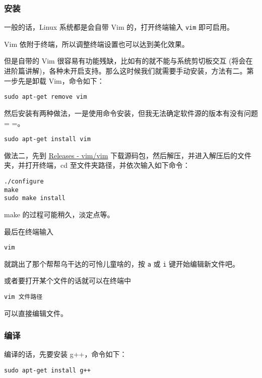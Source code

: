 \subsubsection{安装}

一般的话，Linux 系统都是会自带 Vim 的，打开终端输入 \texttt{vim} 即可启用。

Vim 依附于终端，所以调整终端设置也可以达到美化效果。

但是自带的 Vim 很容易有功能残缺，比如有的就不能与系统剪切板交互 (将会在进阶篇讲解)，各种未开启支持。那么这时候我们就需要手动安装，方法有二。第一步先是卸载 Vim，命令如下：

\begin{verbatim}
sudo apt-get remove vim
\end{verbatim}

然后安装有两种做法，一是使用命令安装，但我无法确定软件源的版本有没有问题 = =。

\begin{verbatim}
sudo apt-get install vim
\end{verbatim}

做法二，先到 \href{https://github.com/vim/vim/releases}{Releases - vim/vim} 下载源码包，然后解压，并进入解压后的文件夹，并打开终端，cd 至文件夹路径，并依次输入如下命令：

\begin{verbatim}
./configure
make
sudo make install
\end{verbatim}

make 的过程可能稍久，淡定点等。

最后在终端输入

\begin{verbatim}
vim
\end{verbatim}

就跳出了那个帮帮乌干达的可怜儿童啥的，按 \texttt{a} 或 \texttt{i} 键开始编辑新文件吧。

或者要打开某个文件的话就可以在终端中

\begin{verbatim}
vim 文件路径
\end{verbatim}

可以直接编辑文件。

\subsubsection{编译}

编译的话，先要安装 g++，命令如下：

\begin{verbatim}
sudo apt-get install g++
\end{verbatim}

